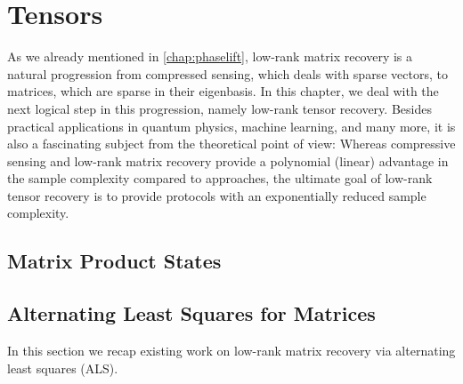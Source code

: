 \chapter{Tensors}
\label{chap:tensors}

As we already mentioned in \cref{chap:phaselift}, low-rank matrix recovery is a natural progression from compressed sensing, which deals with sparse vectors, to matrices, which are sparse in their eigenbasis.
In this chapter, we deal with the next logical step in this progression, namely low-rank tensor recovery.
Besides practical applications in quantum physics, machine learning, and many more, it is also a fascinating subject from the theoretical point of view:
Whereas compressive sensing and low-rank matrix recovery provide a polynomial (linear) advantage in the sample complexity compared to  approaches, the ultimate goal of low-rank tensor recovery is to provide protocols with an exponentially reduced sample complexity.


\section{Matrix Product States}
\label{sec:tensors.mps}


\section{Alternating Least Squares for Matrices}
\label{sec:tensors.matrix_als}

In this section we recap existing work on low-rank matrix recovery via alternating least squares (ALS).




